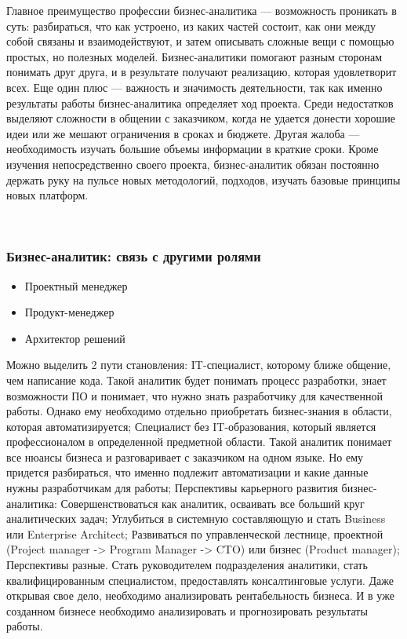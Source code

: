 \documentclass{../industrial-development}
\begin{document}
\lecturenotes

Главное преимущество профессии бизнес-аналитика — возможность проникать в суть: разбираться, что как устроено, из каких частей состоит, как они между собой связаны и взаимодействуют, и затем описывать сложные вещи с помощью простых, но полезных моделей. Бизнес-аналитики помогают разным сторонам понимать друг друга, и в результате получают реализацию, которая удовлетворит всех. Еще один плюс — важность и значимость деятельности, так как именно результаты работы бизнес-аналитика определяет ход проекта. Среди недостатков выделяют сложности в общении с заказчиком, когда не удается донести хорошие идеи или же мешают ограничения в сроках и бюджете. Другая жалоба — необходимость изучать большие объемы информации в краткие сроки. Кроме изучения непосредственно своего проекта, бизнес-аналитик обязан постоянно держать руку на пульсе новых методологий, подходов, изучать базовые принципы новых платформ.

  ~\cite{Business}

\begin{frame} \frametitle{Бизнес-аналитик: связь с другими ролями}
  \begin{itemize}
	\item Проектный менеджер
	\item Продукт-менеджер
	\item Архитектор решений
	\end{itemize}
\end{frame}

\lecturenotes 
Можно выделить 2 пути становления: 
IT-специалист, которому ближе общение, чем написание кода. Такой аналитик будет понимать процесс разработки, знает возможности ПО и понимает, что нужно знать разработчику для качественной работы. Однако ему необходимо отдельно приобретать бизнес-знания в области, которая автоматизируется;
Специалист без IT-образования, который является профессионалом в определенной предметной области. Такой аналитик понимает все нюансы бизнеса и разговаривает с заказчиком на одном языке. Но ему придется разбираться, что именно подлежит автоматизации и какие данные нужны разработчикам для работы;
Перспективы карьерного развития бизнес-аналитика: 
Совершенствоваться как аналитик, осваивать все больший круг аналитических задач;
Углубиться в системную составляющую и стать Business или Enterprise Architect; 
Развиваться по управленческой лестнице, проектной (Project manager -> Program Manager -> CTO) или бизнес (Product manager); 
Перспективы разные. Стать руководителем подразделения аналитики, стать квалифицированным специалистом, предоставлять консалтинговые услуги. Даже открывая свое дело, необходимо анализировать рентабельность бизнеса. И в уже созданном бизнесе необходимо анализировать и прогнозировать результаты работы.~\cite{Business}
\end{document}
